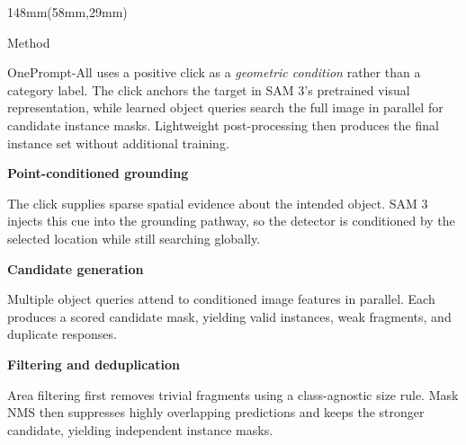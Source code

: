 \documentclass[11pt,a4paper]{article}
\newcommand{\bodyfont}{\fontsize{11.2}{12.0}\selectfont}
\newcommand{\smallfont}{\fontsize{11.0}{11.7}\selectfont}
\newcommand{\subhead}[1]{%
  {\sffamily\fontsize{11.8}{12.4}\selectfont\bfseries #1}%
}
\begin{document}
\begin{textblock*}{148mm}(58mm,29mm)

\begin{sectionbox}[height=118mm]{Method}

\bodyfont
OnePrompt-All uses a positive click as a \textit{geometric condition} rather than
a category label. The click anchors the target in SAM 3's pretrained visual
representation, while learned object queries search the full image in parallel
for candidate instance masks. Lightweight post-processing then produces the
final instance set without additional training.
\par

\vspace{.65mm}

\begin{minipage}[t]{.488\linewidth}

\subhead{Point-conditioned grounding}\par
\vspace{.2mm}
\smallfont
The click supplies sparse spatial evidence about the intended object. SAM 3
injects this cue into the grounding pathway, so the detector is conditioned by
the selected location while still searching globally.

\vspace{.55mm}

\subhead{Candidate generation}\par
\vspace{.2mm}
\smallfont
Multiple object queries attend to conditioned image features in parallel.
Each produces a scored candidate mask, yielding valid instances,
weak fragments, and duplicate responses.
\end{minipage}
\hfill
\begin{minipage}[t]{.488\linewidth}

\subhead{Filtering and deduplication}\par
\vspace{.2mm}
\smallfont
Area filtering first removes trivial fragments using a class-agnostic size rule.
Mask NMS then suppresses highly overlapping predictions and keeps the stronger
candidate, yielding independent instance masks.

\vspace{.55mm}


\end{minipage}
\end{sectionbox}
\end{textblock*}
\end{document}
